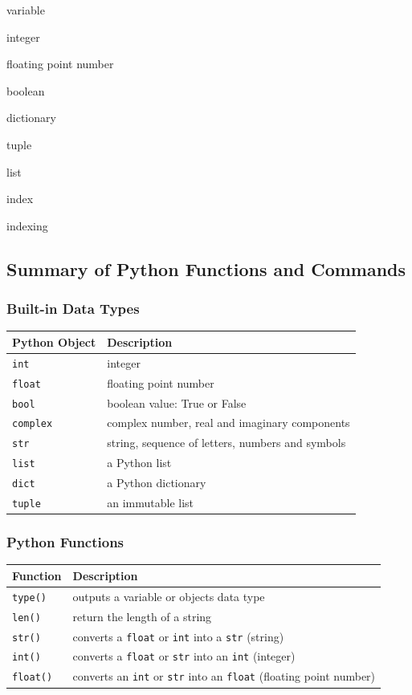 \documentclass{book}
\newenvironment{key_terms}{\begin{multicols}{3}}{\end{multicols}} %
\begin{document}
    
        \begin{key_terms}
        variable

integer

floating point number

boolean

dictionary

tuple

list

index

indexing
        \end{key_terms}

    




    
        \subsection{Summary of Python Functions and
Commands}\label{summary-of-python-functions-and-commands}
    




    
        \subsubsection{Built-in Data Types}\label{built-in-data-types}

\begin{longtable}[]{@{}ll@{}}
\toprule
Python Object & Description\tabularnewline
\midrule
\endhead
\lstinline!int! & integer\tabularnewline
\lstinline!float! & floating point number\tabularnewline
\lstinline!bool! & boolean value: True or False\tabularnewline
\lstinline!complex! & complex number, real and imaginary
components\tabularnewline
\lstinline!str! & string, sequence of letters, numbers and
symbols\tabularnewline
\lstinline!list! & a Python list\tabularnewline
\lstinline!dict! & a Python dictionary\tabularnewline
\lstinline!tuple! & an immutable list\tabularnewline
\bottomrule
\end{longtable}

\subsubsection{Python Functions}\label{python-functions}

\begin{longtable}[]{@{}ll@{}}
\toprule
Function & Description\tabularnewline
\midrule
\endhead
\lstinline!type()! & outputs a variable or objects data
type\tabularnewline
\lstinline!len()! & return the length of a string\tabularnewline
\lstinline!str()! & converts a \lstinline!float! or \lstinline!int! into
a \lstinline!str! (string)\tabularnewline
\lstinline!int()! & converts a \lstinline!float! or \lstinline!str! into
an \lstinline!int! (integer)\tabularnewline
\lstinline!float()! & converts an \lstinline!int! or \lstinline!str!
into an \lstinline!float! (floating point number)\tabularnewline
\bottomrule
\end{longtable}
\end{document}
